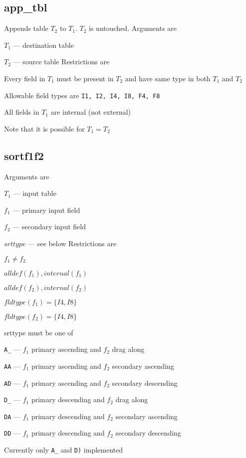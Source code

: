 \documentclass{report}
\begin{document}
\subsection{app\_tbl}
\label{app_tbl}

Appends table \(T_2\) to \(T_1\). \(T_2\) is untouched. 
Arguments are
\be
\item \(T_1\) --- destination table 
\item \(T_2\) --- source table
\ee
Restrictions are
\be
\item Every field in \(T_1\) must be present in \(T_2\) and have same
type in both \(T_1\) and \(T_2\)
\item Allowable field types are {\tt I1, I2, I4, I8, F4, F8}
\item All fields in \(T_1\) are internal (not external)
\item Note that it is possible for \(T_1 = T_2\)
\ee

\subsection{sortf1f2}
\label{sortf1f2}

Arguments are
\be
\item \(T_1\) --- input table 
\item \(f_1\) --- primary input field 
\item \(f_2\) --- secondary input field 
\item \(srttype\) --- see below
\ee
Restrictions are
\be
\item \(f_1 \neq f_2\)
\item \(alldef(f_1), internal(f_1)\)
\item \(alldef(f_2), internal(f_2)\)
\item \(fldtype(f_1) = \{I4, I8\}\)
\item \(fldtype(f_2) = \{I4, I8\}\)
\item srttype must be one of 
\be
\item \verb+A_+ --- \(f_1\) primary ascending and \(f_2\) drag along
\item \verb+AA+ --- \(f_1\) primary ascending and \(f_2\) secondary ascending
\item \verb+AD+ --- \(f_1\) primary ascending and \(f_2\) secondary descending
\item \verb+D_+ --- \(f_1\) primary descending and \(f_2\) drag along
\item \verb+DA+ --- \(f_1\) primary descending and \(f_2\) secondary ascending
\item \verb+DD+ --- \(f_1\) primary descending and \(f_2\) secondary descending
\ee
\item Currently only \verb+A_+ and \verb+D)+ implemented
\ee
\end{document}
